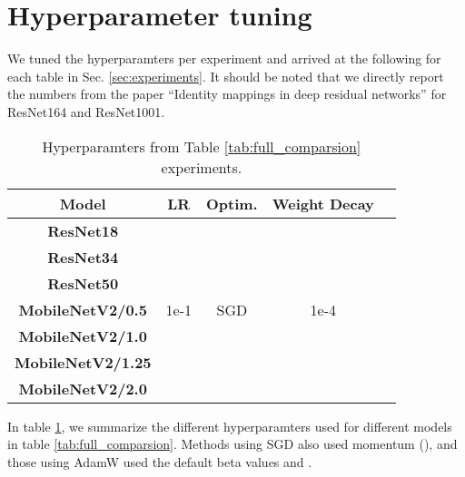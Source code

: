 \documentclass[10pt,twocolumn,letterpaper]{article}
\begin{document}
{\small


}

\appendix

\section{Hyperparameter tuning}
\label{appdx:hyperparam}
We tuned the hyperparamters per experiment and arrived at the following for each table in Sec. \ref{sec:experiments}. It should be noted that we directly report the numbers from the paper ``Identity mappings in deep residual networks'' \cite{he2016identity} for ResNet164 and ResNet1001.

\begin{table}[ht]
    \small
    \centering
    \begin{tabular}{c|cccc}
        \toprule
        \textbf{Model} & \textbf{LR} & \textbf{Optim.} & \textbf{Weight Decay}\\
        \midrule
        \textbf{ResNet18} & \multirow{9}{*}{1e-1} & \multirow{9}{*}{SGD} & \multirow{9}{*}{1e-4} \\
        \textbf{ResNet34} \\
        \textbf{ResNet50} \\
\textbf{MobileNetV2/0.5} \\
        \textbf{MobileNetV2/1.0} \\
        \textbf{MobileNetV2/1.25} \\
        \textbf{MobileNetV2/2.0} \\
        \bottomrule
    \end{tabular}
    \caption{Hyperparamters from Table \ref{tab:full_comparsion} experiments.}
    \label{tab:cnn_comparison_hyperparams}
\end{table} In table \ref{tab:cnn_comparison_hyperparams}, we summarize the different hyperparamters used for different models in table \ref{tab:full_comparsion}. Methods using SGD also used momentum (), and those using AdamW used the default beta values  and . 
\end{document}
